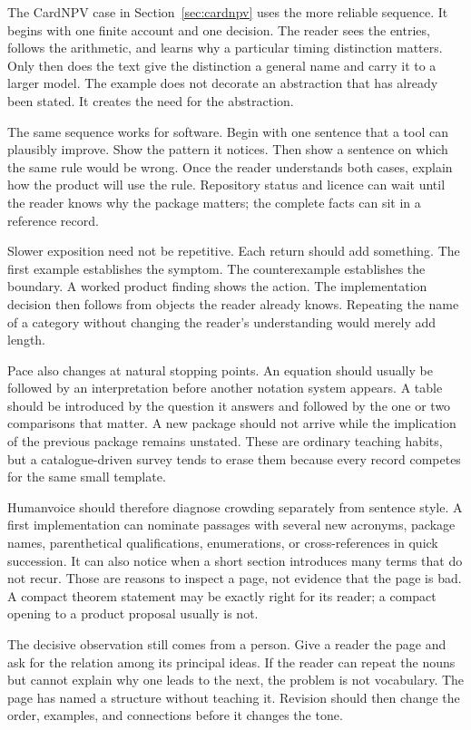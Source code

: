 The CardNPV case in Section~\ref{sec:cardnpv} uses the more reliable sequence.
It begins with one finite account and one decision. The reader sees the entries,
follows the arithmetic, and learns why a particular timing distinction matters.
Only then does the text give the distinction a general name and carry it to a
larger model. The example does not decorate an abstraction that has already
been stated. It creates the need for the abstraction.

The same sequence works for software. Begin with one sentence that a tool can
plausibly improve. Show the pattern it notices. Then show a sentence on which
the same rule would be wrong. Once the reader understands both cases, explain
how the product will use the rule. Repository status and licence can wait until
the reader knows why the package matters; the complete facts can sit in a
reference record.

\hvFigureConceptPace

Slower exposition need not be repetitive. Each return should add something.
The first example establishes the symptom. The counterexample establishes the
boundary. A worked product finding shows the action. The implementation
decision then follows from objects the reader already knows. Repeating the name
of a category without changing the reader's understanding would merely add
length.

Pace also changes at natural stopping points. An equation should usually be
followed by an interpretation before another notation system appears. A table
should be introduced by the question it answers and followed by the one or two
comparisons that matter. A new package should not arrive while the implication
of the previous package remains unstated. These are ordinary teaching habits,
but a catalogue-driven survey tends to erase them because every record competes
for the same small template.

Humanvoice should therefore diagnose crowding separately from sentence style.
A first implementation can nominate passages with several new acronyms,
package names, parenthetical qualifications, enumerations, or cross-references
in quick succession. It can also notice when a short section introduces many
terms that do not recur. Those are reasons to inspect a page, not evidence that
the page is bad. A compact theorem statement may be exactly right for its
reader; a compact opening to a product proposal usually is not.

The decisive observation still comes from a person. Give a reader the page and
ask for the relation among its principal ideas. If the reader can repeat the
nouns but cannot explain why one leads to the next, the problem is not
vocabulary. The page has named a structure without teaching it. Revision should
then change the order, examples, and connections before it changes the tone.

